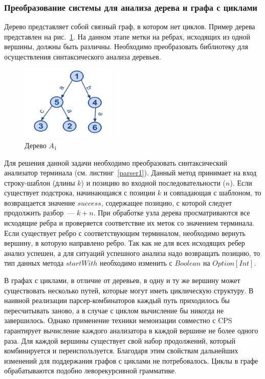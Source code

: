 \subsubsection{Преобразование системы для анализа дерева и графа с циклами}


Дерево представляет собой связный граф, в котором нет циклов. Пример дерева представлен на рис.~\ref{Graph1}. На данном этапе метки на ребрах, исходящих из одной вершины, должны быть различны. Необходимо преобразовать библиотеку для осуществления синтаксического анализа деревьев.

\begin{figure}

 \centering
 \includegraphics[width=0.4\textwidth]{Smolina/pics/Graph1.png}
 \caption{Дерево $A_1$}
 \label{Graph1}
\end{figure}

Для решения данной задачи необходимо преобразовать синтаксический анализатор терминала (см. листинг~\ref{parser1}). Данный метод принимает на вход строку-шаблон (длины $k$) и позицию во входной последовательности ($n$). Если существует подстрока, начинающаяся с позиции $k$ и совпадающая с шаблоном, то возвращается значение $success$, содержащее позицию, с которой следует продолжить разбор~--- $k+n$. При обработке узла дерева просматриваются все исходящие ребра и проверяется соответствие их меток со значением терминала. Если существует ребро с соответствующим терминалом, необходимо вернуть вершину, в которую направлено ребро. Так как не для всех исходящих ребер анализ успешен, а для ситуаций успешного анализа надо возвращать позицию, то тип данных метода $startWith$ необходимо изменить с $Boolean$ на $Option[Int]$.

В графах с циклами, в отличие от деревьев, в одну и ту же вершину может существовать несколько путей, которые могут иметь циклическую структуру. В наивной реализации парсер-комбинаторов каждый путь приходилось бы пересчитывать заново, а в случае с циклом вычисление бы никогда не завершилось. Однако применение техники мемоизации совместно с CPS гарантирует вычисление каждого анализатора в каждой вершине не более одного раза. Для каждой вершины существует свой набор продолжений, который комбинируется и переиспользуется. Благодаря этим свойствам дальнейших изменений для поддержания графов с циклами не потребовалось. Циклы в графе обрабатываются подобно леворекурсивной грамматике.


